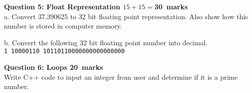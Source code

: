 \documentclass[12pt,a4paper]{article}
\def\Qfive{30}
\def\Qsix{20}
\begin{document}
\newpage
\noindent\textbf{Question 5: Float Representation \hfill $15+15=$\Qfive~marks}\\
a. Convert 37.390625 to 32 bit floating point representation. Also show how this number is stored in computer memory.
\begin{figure}[H]
\end{figure}
\noindent b. Convert the following 32 bit floating point number into decimal.\\
\verb|1 10000110 10110110000000000000000|
\begin{figure}[H]
\end{figure}
\newpage
\noindent\textbf{Question 6: Loops \hfill \Qsix~marks}\\
Write C++ code to input an integer from user and determine if it is a prime number.
\begin{figure}[H]
\end{figure}
\end{document}
